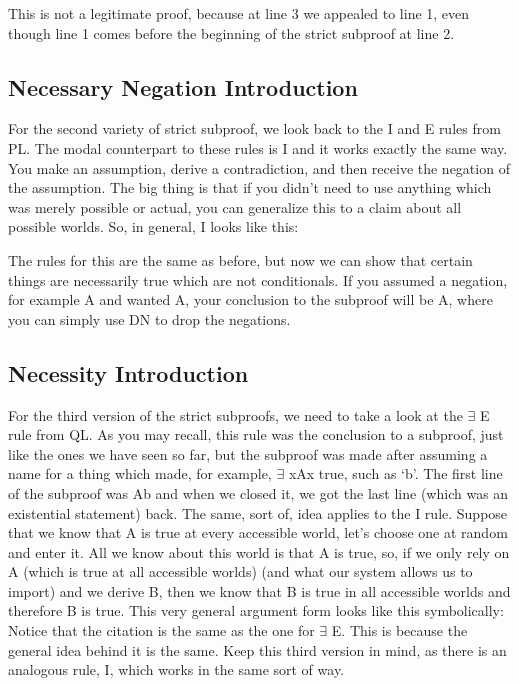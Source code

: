 This is not a legitimate proof, because at line 3 we appealed to line 1, even though line 1 comes before the beginning of the strict subproof at line 2.

\subsection{Necessary Negation Introduction}

For the second variety of strict subproof, we look back to the \enot I and \enot E rules from PL. The modal counterpart to these rules is \ebox \enot I and it works exactly the same way. You make an assumption, derive a contradiction, and then receive the negation of the assumption. The big thing is that if you didn't need to use anything which was merely possible or actual, you can generalize this to a claim about all possible worlds. So, in general, \ebox \enot I looks like this: 

The rules for this are the same as before, but now we can show that certain things are necessarily true which are not conditionals. If you assumed a negation, for example \enot A and wanted \ebox A, your conclusion to the subproof will be \ebox \enot \enot A, where you can simply use DN to drop the negations. 

\subsection{Necessity Introduction}

For the third version of the strict subproofs, we need to take a look at the $\exists$ E rule from QL. As you may recall, this rule was the conclusion to a subproof, just like the ones we have seen so far, but the subproof was made after assuming a name for a thing which made, for example, $\exists$ xAx true, such as `b'. The first line of the subproof was Ab and when we closed it, we got the last line (which was an existential statement) back. The same, sort of, idea applies to the \ebox I rule. Suppose that we know that A is true at every accessible world, let's choose one at random and enter it. All we know about this world is that A is true, so, if we only rely on A (which is true at all accessible worlds) (and what our system allows us to import) and we derive B, then we know that B is true in all accessible worlds and therefore \ebox B is true. This very general argument form looks like this symbolically:
Notice that the citation is the same as the one for $\exists$ E. This is because the general idea behind it is the same. Keep this third version in mind, as there is an analogous rule, \ediamond I, which works in the same sort of way.
